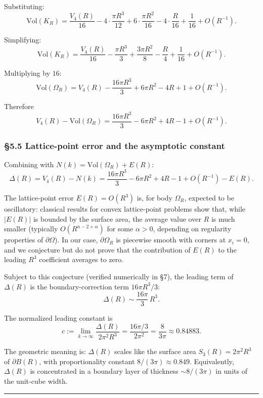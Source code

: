 \documentclass[a4paper,11pt]{article}
\theoremstyle{definition}
\begin{document}
Substituting:
\[\mathrm{Vol}(K_R) = \frac{V_4(R)}{16} - 4 \cdot \frac{\pi R^3}{12} + 6 \cdot \frac{\pi R^2}{16} - 4 \cdot \frac{R}{16} + \frac{1}{16} + O(R^{-1}).\]

Simplifying:
\[\mathrm{Vol}(K_R) = \frac{V_4(R)}{16} - \frac{\pi R^3}{3} + \frac{3\pi R^2}{8} - \frac{R}{4} + \frac{1}{16} + O(R^{-1}).\]

Multiplying by \(16\):
\[\boxed{\;\mathrm{Vol}(\Omega_R) = V_4(R) - \frac{16\pi R^3}{3} + 6\pi R^2 - 4 R + 1 + O(R^{-1}).\;}\]

Therefore
\[V_4(R) - \mathrm{Vol}(\Omega_R) = \frac{16\pi R^3}{3} - 6\pi R^2 + 4R - 1 + O(R^{-1}).\]

\subsubsection{§5.5 Lattice-point error and the asymptotic
constant}\label{lattice-point-error-and-the-asymptotic-constant}

Combining with \(N(k) = \mathrm{Vol}(\Omega_R) + E(R)\):
\[\Delta(R) = V_4(R) - N(k) = \frac{16\pi R^3}{3} - 6\pi R^2 + 4R - 1 + O(R^{-1}) - E(R).\]

The lattice-point error \(E(R) = O(R^3)\) is, for body \(\Omega_R\),
expected to be oscillatory: classical results for convex lattice-point
problems show that, while \(|E(R)|\) is bounded by the surface area, the
average value over \(R\) is much smaller (typically
\(O(R^{n-2+\alpha})\) for some \(\alpha > 0\), depending on regularity
properties of \(\partial \Omega\)). In our case, \(\partial \Omega_R\)
is piecewise smooth with corners at \(x_i = 0\), and we conjecture but
do not prove that the contribution of \(E(R)\) to the leading \(R^3\)
coefficient averages to zero.

Subject to this conjecture (verified numerically in §7), the leading
term of \(\Delta(R)\) is the boundary-correction term \(16\pi R^3/3\):
\[\Delta(R) \sim \frac{16\pi}{3}\, R^3.\]

The normalized leading constant is
\[\boxed{\;c := \lim_{k \to \infty} \frac{\Delta(R)}{2\pi^2 R^3} = \frac{16\pi/3}{2\pi^2} = \frac{8}{3\pi} \approx 0.84883.\;}\]

The geometric meaning is: \(\Delta(R)\) scales like the surface area
\(S_3(R) = 2\pi^2 R^3\) of \(\partial B(R)\), with proportionality
constant \(8/(3\pi) \approx 0.849\). Equivalently, \(\Delta(R)\) is
concentrated in a boundary layer of thickness \(\sim 8/(3\pi)\) in units
of the unit-cube width.

\begin{center}\rule{0.5\linewidth}{0.5pt}\end{center}
\end{document}
